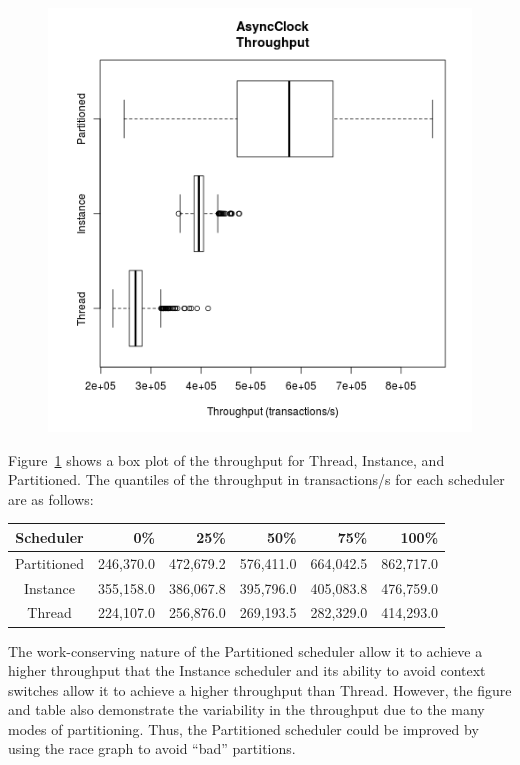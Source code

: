 \begin{figure}
\center
\includegraphics[height=.4\textheight]{async_throughput_box.png}
\caption{\label{async_throughput_box}}
\end{figure}

Figure~\ref{async_throughput_box} shows a box plot of the throughput for Thread, Instance, and Partitioned.
The quantiles of the throughput in transactions/s for each scheduler are as follows:
\begin{center}
\begin{tabular}{crrrrr}
Scheduler   &       0\%   &    25\%     &    50\%     &    75\%     &   100\% \\
\hline
Partitioned &   246,370.0 &   472,679.2 &   576,411.0 &   664,042.5 &    862,717.0 \\
Instance    &   355,158.0 &   386,067.8 &   395,796.0 &   405,083.8 &    476,759.0 \\
Thread      &   224,107.0 &   256,876.0 &   269,193.5 &   282,329.0 &    414,293.0 \\
\end{tabular}
\end{center}
The work-conserving nature of the Partitioned scheduler allow it to achieve a higher throughput that the Instance scheduler and its ability to avoid context switches allow it to achieve a higher throughput than Thread.
However, the figure and table also demonstrate the variability in the throughput due to the many modes of partitioning.
Thus, the Partitioned scheduler could be improved by using the race graph to avoid ``bad'' partitions.

